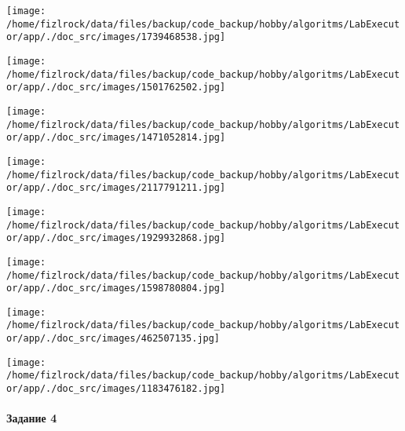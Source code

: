 \documentclass[a4paper, 12pt]{article}
\begin{document}
\texttt{[image: /home/fizlrock/data/files/backup/code\_backup/hobby/algoritms/LabExecutor/app/./doc\_src/images/1739468538.jpg]}

\texttt{[image: /home/fizlrock/data/files/backup/code\_backup/hobby/algoritms/LabExecutor/app/./doc\_src/images/1501762502.jpg]}

\texttt{[image: /home/fizlrock/data/files/backup/code\_backup/hobby/algoritms/LabExecutor/app/./doc\_src/images/1471052814.jpg]}

\texttt{[image: /home/fizlrock/data/files/backup/code\_backup/hobby/algoritms/LabExecutor/app/./doc\_src/images/2117791211.jpg]}

\texttt{[image: /home/fizlrock/data/files/backup/code\_backup/hobby/algoritms/LabExecutor/app/./doc\_src/images/1929932868.jpg]}

\texttt{[image: /home/fizlrock/data/files/backup/code\_backup/hobby/algoritms/LabExecutor/app/./doc\_src/images/1598780804.jpg]}

\texttt{[image: /home/fizlrock/data/files/backup/code\_backup/hobby/algoritms/LabExecutor/app/./doc\_src/images/462507135.jpg]}

\texttt{[image: /home/fizlrock/data/files/backup/code\_backup/hobby/algoritms/LabExecutor/app/./doc\_src/images/1183476182.jpg]}
\pagebreak
\paragraph{Задание 4}
\end{document}
